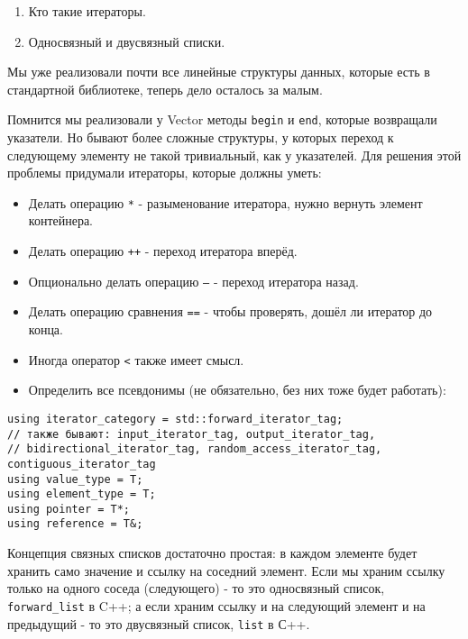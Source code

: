 \label{md2tex6}
\hyperref[md2texREADME]{\color{cyan}{К главному описанию}}


\begin{enumerate}
    \item Кто такие итераторы.
    \item Односвязный и двусвязный списки.
\end{enumerate}


Мы уже реализовали почти все линейные структуры данных, которые есть в стандартной библиотеке, теперь дело осталось за малым.


Помнится мы реализовали у Vector методы \texttt{begin} и \texttt{end}, которые возвращали указатели. Но бывают более сложные структуры, у которых переход к следующему элементу не такой тривиальный, как у указателей. Для решения этой проблемы придумали итераторы, которые должны уметь:
\begin{itemize}
    \item Делать операцию \texttt{*} - разыменование итератора, нужно вернуть элемент контейнера.
    \item Делать операцию \texttt{++} - переход итератора вперёд.
    \item Опционально делать операцию \texttt{--} - переход итератора назад.
    \item Делать операцию сравнения \texttt{==} - чтобы проверять, дошёл ли итератор до конца.
    \item Иногда оператор \texttt{<} также имеет смысл.
    \item Определить все псевдонимы (не обязательно, без них тоже будет работать):
\end{itemize}
\begin{verbatim}
using iterator_category = std::forward_iterator_tag;
// также бывают: input_iterator_tag, output_iterator_tag,
// bidirectional_iterator_tag, random_access_iterator_tag, contiguous_iterator_tag
using value_type = T;
using element_type = T;
using pointer = T*;
using reference = T&;
\end{verbatim}



Концепция связных списков достаточно простая: в каждом элементе будет хранить само значение и ссылку на соседний элемент. Если мы храним ссылку только на одного соседа (следующего) - то это односвязный список, \texttt{forward_list} в C++; а если храним ссылку и на следующий элемент и на предыдущий - то это двусвязный список, \texttt{list} в С++.

